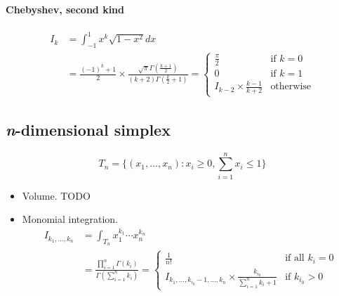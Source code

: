 \documentclass[draft]{scrartcl}
\begin{document}
\paragraph{Chebyshev, second kind}
\[
  \begin{split}
  I_k
    &= \int_{-1}^1 x^k \sqrt{1 - x^2} dx\\
    &= \frac{(-1)^k + 1}{2} \times \frac{\sqrt{\pi} \Gamma(\frac{k+1}{2})}{(k + 2) \Gamma(\frac{k}{2} + 1)}
  = \begin{cases}
    \frac{\pi}{2}&\text{if $k = 0$}\\
    0&\text{if $k = 1$}\\
    I_{k-2} \times \frac{k-1}{k + 2}&\text{otherwise}
  \end{cases}
  \end{split}
\]


\subsection*{\textit{n}-dimensional simplex}
\[
  T_n = \{(x_1,\dots,x_n):x_i \geq 0, \sum_{i=1}^n x_i \leq 1\}
\]

\begin{itemize}
  \item Volume. TODO
  \item Monomial integration.
  \[
    \begin{split}
    I_{k_1,\dots,k_n}
    &= \int_{T_n} x_1^{k_1}\cdots x_n^{k_n}\\
    &= \frac{\prod_{i=1}^n\Gamma(k_i)}{\Gamma\left(\sum_{i=1}^n k_i\right)}
    =\begin{cases}
      \frac{1}{n!}&\text{if all $k_i=0$}\\
      I_{k_1,\dots,k_{i_0}-1,\dots,k_n} \times \frac{k_{i_0}}{\sum_{i=1}^n k_i+1}&\text{if $k_{i_0} > 0$}
    \end{cases}
  \end{split}
  \]
\end{itemize}

{}

\end{document}

